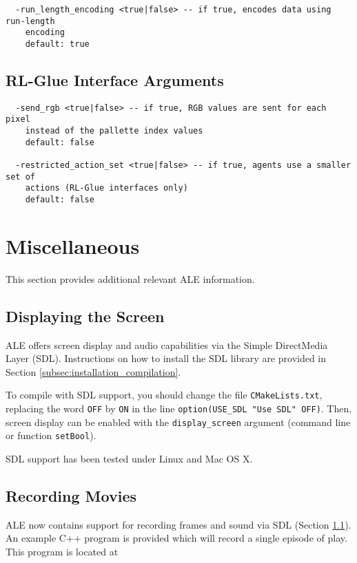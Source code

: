 \documentclass[12pt]{article}
\begin{document}
\small{
\begin{verbatim}
  -run_length_encoding <true|false> -- if true, encodes data using run-length
    encoding
    default: true
\end{verbatim}
}

\subsection{RL-Glue Interface Arguments}

\small{
\begin{verbatim}
  -send_rgb <true|false> -- if true, RGB values are sent for each pixel
    instead of the pallette index values
    default: false
    
  -restricted_action_set <true|false> -- if true, agents use a smaller set of 
    actions (RL-Glue interfaces only)
    default: false    
\end{verbatim}
}

\section{Miscellaneous}

This section provides additional relevant ALE information.

\subsection{Displaying the Screen}\label{subsec:displaying_screen}

ALE offers screen display and audio capabilities via the Simple DirectMedia Layer (SDL).
Instructions on how to install the SDL library are provided in Section \ref{subsec:installation_compilation}. 

To compile with SDL support, you should change the file \verb+CMakeLists.txt+, replacing
the word \verb+OFF+ by \verb+ON+ in the line \verb+option(USE_SDL "Use SDL" OFF)+.
Then, screen display can be enabled with the \verb+display_screen+ argument (command line
or function \verb+setBool+). 

SDL support has been tested under Linux and Mac OS X. 

\subsection{Recording Movies}

ALE now contains support for recording frames and sound via SDL (Section \ref{subsec:displaying_screen}).
An example C++ program is provided which will record a single episode of play. This program is located at
\end{document}
